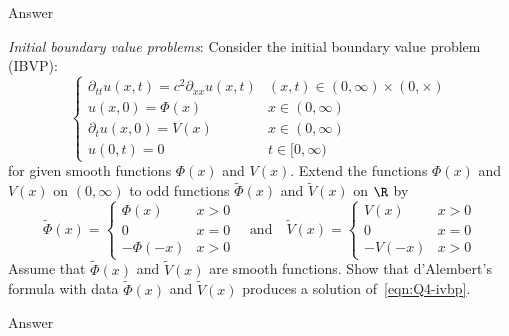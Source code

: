 \documentclass[a4paper]{article}
\begin{document}
Answer



\begin{questionbody}
\textit{Initial boundary value problems}: Consider the initial boundary value problem (IBVP):
\begin{equation}
\begin{cases}
\partial_{tt} u(x, t) = c^2 \partial_{xx} u(x, t) & (x, t) \in (0, \infty) \times (0, \times) \\
u(x, 0) = \Phi(x) & x \in (0, \infty) \\
\partial_t u(x, 0) = V(x) & x \in (0, \infty) \\
u(0, t) = 0 & t \in [0, \infty) %
\end{cases} \label{eqn:Q4-ivbp}
\end{equation}
for given smooth functions $\Phi(x)$ and $V(x)$. Extend the functions $\Phi(x)$ and $V(x)$ on $(0, \infty)$ to odd functions $\tilde \Phi(x)$ and $\tilde V(x)$ on $\R$ by \[
\tilde \Phi(x) = \begin{cases}
\Phi(x)   & x > 0 \\
0         & x = 0 \\
-\Phi(-x) & x > 0
\end{cases}
\quad \text{and} \quad
\tilde V(x) = \begin{cases}
V(x)   & x > 0 \\
0      & x = 0 \\
-V(-x) & x > 0
\end{cases}
\]
Assume that $\tilde \Phi(x)$ and $\tilde V(x)$ are smooth functions. Show that d'Alembert's formula with data $\tilde \Phi(x)$ and $\tilde V(x)$ produces a solution of~\eqref{eqn:Q4-ivbp}.
\end{questionbody}

Answer

\end{document}
